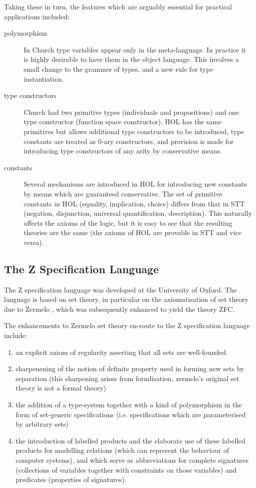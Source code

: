\documentclass{rbjk}
\begin{document}
\begin{article}
Taking these in turn, the features which are arguably essential for
practical applications included:

\begin{description}
\item[polymorphism]
In Church\cite{church40} type variables appear only in the
meta-language.
In practice it is highly desirable to have them in the object
language.
This involves a small change to the grammer of types, and a new rule
for type instantiation.
\item[type constructors]
Church had two primitive types (individuals and propositions) and one
type constructor (function space constructor).
HOL has the same primitives but allows additional type constructors to
be introduced, type constants are treated as 0-ary constructors, and
provision is made for introducing type constructors of any arity by
conservative means.
\item[constants]
Several mechanisms are introduced in HOL for introducing new constants
by means which are guaranteed conservative.
The set of primitive constants in HOL (equality, implication, choice)
differs from that in STT (negation, disjunction, universal
quantification, description).
This naturally affects the axioms of the logic, but it is easy to see
that the resulting theories are the same (the axioms of HOL are
provable in STT and vice versa).

\end{description}

\subsection{The Z Specification Language}

The Z specification language was developed at the University of
Oxford.
The language is based on set theory, in particular on the
axiomatisation of set theory due to Zermelo \cite{zermelo08}, which
was subsequently enhanced to yield the theory ZFC.

The enhancements to Zermelo set theory en-route to the Z specification
language include:
\begin{enumerate}
\item an explicit axiom of regularity asserting that all sets are
  well-founded.
\item sharpenening of the notion of definite property used in
  forming new sets by separation (this sharpening arises from
  formlisation, zermelo's original set theory is not a formal theory)
\item the addition of a type-system together with a kind of
  polymorphism in the form of set-generic specifications
  (i.e. specifications which are parameterised by arbitrary sets)
\item the introduction of labelled products and the elaborate use of
  these labelled products for modelling relations (which can represent
  the behaviour of computer systems), and which serve as abbreviations
  for complete signatures (collections of variables together with
  constraints on those variables) and predicates (properties of signatures).
\end{enumerate}


\end{article}
\end{document}

